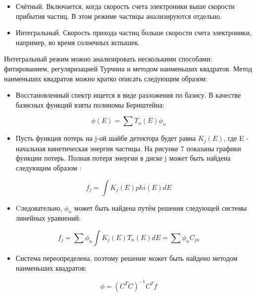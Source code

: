 \documentclass[a0paper,portrait, fontscale=0.4]{baposter}
\begin{document}
\begin{poster}
{\begin{itemize}
    \item{Счётный. Включается, когда скорость счета электроники выше скорости прибытия частиц. В этом режиме частицы анализируются отдельно.} 
    \item{Интегральный. Скорость прихода частиц больше скорости счета электроники, например, во время солнечных вспышек.}
\end{itemize}
Интегральный режим можно анализировать несколькими способами: фитированием, регуляризацией Турчина и методом наименьших квадратов. Метод наименьших квадратов можно кратко описать следующим образом:

\begin{itemize}
    \item{Восстановленный спектр ищется в виде разложения по базису. В качестве базисных функций взяты полиномы Бернштейна:}
\end{itemize}
\begin{equation}
    \phi(E) = \sum T_n(E) \phi_n
\end{equation}
\begin{itemize}
    \item{Пусть функция потерь на j-ой шайбе детектора будет равна $K_j(E)$, где E - начальная кинетическая энергия частицы. На рисунке 7 показаны графики функции потерь. Полная потеря энергии в диске j может быть найдена следующим образом :}
\end{itemize}
\begin{equation}
    f_j = \int K_j(E) phi(E) d E
\end{equation}
\begin{itemize}
    \item{Cледовательно, $\phi_n$ может быть найдена путём решения следующей системы линейных уравнений:}
\end{itemize}
\begin{equation}
    f_j = \sum \phi_n \int K_j(E) T_n(E) d E = \sum \phi_n C_{j n}
\end{equation}
\begin{itemize}
    \item{Система переопределена, поэтому решение может быть найдено методом наименьших квадратов:}
\end{itemize}
\begin{equation}
    \phi = \left(C^TC\right)^{-1}C^T f
\end{equation}
}



\end{poster}
\end{document}
